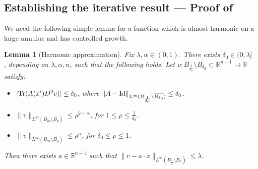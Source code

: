 \documentclass{article}
\newcommand{\R}{\mathbb{R}}
\newtheorem{lemma}[theorem]{Lemma}
\theoremstyle{definition}
\begin{document}
\subsection{Establishing the iterative result --- Proof of }
We need the following simple lemma for a function which is almost harmonic on a large annulus and has controlled growth.
\begin{lemma}[Harmonic approximation]\label{lincomp} Fix $\lambda, \alpha\in (0,1)$. There exists $\delta_0\in(0,\lambda]$, depending on $\lambda, \alpha, n$, such that the following holds. Let $v:B_{\frac{1}{\delta_0}}\setminus \overline{B_{\delta_0}}\subset \R^{n-1} \to \R$ satisfy:
\begin{itemize}
    \item $|{\rm Tr}(A(x')D^2 v)|\leq \delta_0$, where $\|A-{\rm Id}\|_{L^\infty(B_{\frac{1}{\delta_0}}\setminus \overline{B_{\delta_0}})}\leq \delta_0$.
    
    \item $\|v\|_{L^\infty(B_{2\rho}\setminus \overline{B_\rho})}\leq \rho^{2-\alpha}$, for $1\leq\rho\leq\frac{1}{\delta_0}$.
    
    \item $\|v\|_{L^\infty(B_{2\rho}\setminus \overline{B_\rho})}\leq \rho^{\alpha}$, for $\delta_0\leq\rho\leq 1$.
\end{itemize}
Then there exists $a\in\R^{n-1}$ such that $\|v-a\cdot x\|_{L^\infty(B_{\frac{1}{\lambda}}\setminus \overline{B_{\lambda}})
}\leq \lambda$.
\end{lemma}
\end{document}
